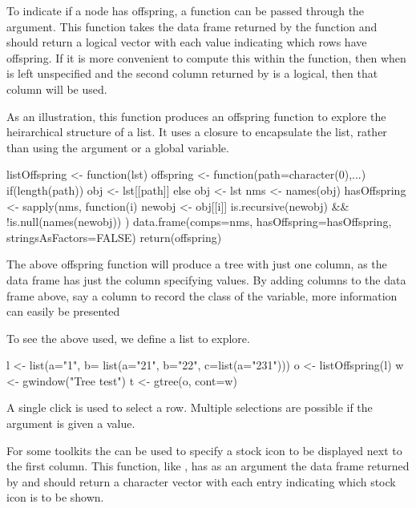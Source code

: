 To indicate if a node has offspring, a function can be passed through
the  argument. This function takes the
data frame returned by the  function and should return
a logical vector with each value indicating which rows have
offspring. If it is more convenient to compute this within the
 function, then when  is left
unspecified and the second column returned by  is a
logical, then that column will be used.

As an illustration, this function produces an offspring function to
explore the heirarchical structure of a list. It uses a closure to
encapsulate the list, rather than using the
 argument or a global variable.
\begin{Schunk}
\begin{Sinput}
 listOffspring <- function(lst) {
   offspring <- function(path=character(0),...) {
     if(length(path))
       obj <- lst[[path]]
     else
       obj <- lst
     nms <- names(obj)
     hasOffspring <- sapply(nms, function(i) {
       newobj <- obj[[i]]
       is.recursive(newobj) && !is.null(names(newobj))
     })
     data.frame(comps=nms, hasOffspring=hasOffspring, 
                stringsAsFactors=FALSE)
   }
   return(offspring)                     
 }
\end{Sinput}
\end{Schunk}
%
The above offspring function will produce a tree with just one column,
as the data frame has just the  column specifying
values. By adding columns to the data frame above, say a column to
record the class of the variable, more information can easily be
presented

To see the above used, we define a list to explore.
\begin{Schunk}
\begin{Sinput}
 l <- list(a="1", b= list(a="21", b="22", c=list(a="231")))
 o <- listOffspring(l)
 w <- gwindow("Tree test")
 t <- gtree(o, cont=w)
\end{Sinput}
\end{Schunk}


A single click is used to select a row. Multiple selections are
possible if the  argument is given a
 value.

For some toolkits the  can be used to
specify a stock icon to be displayed next to the first column. This
function, like , has as an argument the data frame
returned by  and should return a character vector with
each entry indicating which stock icon is to be shown.

